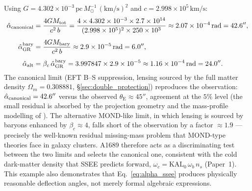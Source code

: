 \documentclass[12pt,a4paper]{article}
\newcommand{\KAL}{\mathrm{KAL}_0}
\newcommand{\bc}{\beta_c}
\newcommand{\thetaE}{\theta_{\mathrm{E}}}
\newcommand{\hatalf}{\hat{\alpha}}
\begin{document}
Using $G = 4.302\times10^{-3}\,\mathrm{pc}\,M_\odot^{-1}\,(\mathrm{km/s})^2$
and $c = 2.998\times10^5\,\mathrm{km/s}$:
\begin{align}
  \hatalf_{\rm canonical} &= \frac{4GM_{\rm tot}}{c^2\,b}
    = \frac{4 \times 4.302\times10^{-3} \times 2.7\times10^{14}}{(2.998\times10^5)^2 \times 250\times10^3}
    \approx 2.07\times10^{-4}\,\mathrm{rad} = 42.6'', \\[4pt]
  \hatalf_{\rm GR}^{\rm bary} &= \frac{4GM_{\rm bary}}{c^2\,b}
    \approx 2.9\times10^{-5}\,\mathrm{rad} = 6.0'', \\[4pt]
  \hatalf_{\rm alt} &= \bc\,\hatalf_{\rm GR}^{\rm bary}
    = 3.997847 \times 2.9\times10^{-5}
    \approx 1.16\times10^{-4}\,\mathrm{rad} = 24.0''.
\end{align}
The canonical limit (EFT B--S suppression, lensing sourced by the full
matter density $\Omega_m=0.308881$, \S\ref{sec:double_protection}) reproduces the
observation: $\hatalf_{\rm canonical} = 42.6''$ versus the observed
$\thetaE \approx 45''$, agreement at the $5\%$ level (the small residual
is absorbed by the projection geometry and the mass-profile modelling of
\citealp{Limousin2007}).
The alternative MOND-like limit, in which lensing is sourced by baryons
enhanced by $\bc \approx 4$, falls short of the observation by a factor
$\approx 1.9$ --- precisely the well-known residual missing-mass problem
that MOND-type theories face in galaxy clusters.
A1689 therefore acts as a discriminating test between the two limits and
selects the canonical one, consistent with the cold dark-matter density
that SSEE predicts forward, $\omega_c=\KAL\,\omega_b\,n_s$
(Paper~1).%
This example also demonstrates that Eq.~\eqref{eq:alpha_ssee} produces
physically reasonable deflection angles, not merely formal algebraic
expressions.
\end{document}

